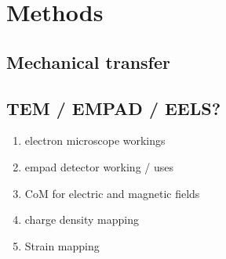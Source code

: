 \section{Methods}
\subsection{Mechanical transfer}
\subsection{TEM / EMPAD / EELS?}
\begin{enumerate}
    \item electron microscope workings
    \item empad detector working / uses
    \item CoM for electric and magnetic fields
    \item charge density mapping
    \item Strain mapping
\end{enumerate}
